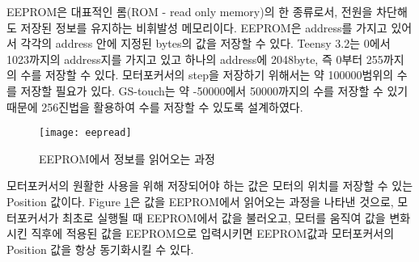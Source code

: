 EEPROM은 대표적인 롬(ROM - read only memory)의 한 종류로서, 전원을 차단해도 저장된 정보를 유지하는 비휘발성 메모리이다. EEPROM은 address를 가지고 있어서 각각의 address 안에 지정된 bytes의 값을 저장할 수 있다. Teensy 3.2는 0에서 1023까지의 address지를 가지고 있고 하나의 address에 2048byte, 즉 0부터 255까지의 수를 저장할 수 있다. 모터포커서의 step을 저장하기 위해서는 약 100000범위의 수를 저장할 필요가 있다. GS-touch는 약 -50000에서 50000까지의 수를 저장할 수 있기 때문에 256진법을 활용하여 수를 저장할 수 있도록 설계하였다.


\begin{figure}[ht]
	\begin{center}
		\texttt{[image: eepread]}
	\end{center}
	\caption{EEPROM에서 정보를 읽어오는 과정}
	\label{eepread}
\end{figure}

 모터포커서의 원활한 사용을 위해 저장되어야 하는 값은 모터의 위치를 저장할 수 있는 Position 값이다. \textrm{Figure} \ref{eepread}은 값을 EEPROM에서 읽어오는 과정을 나타낸 것으로, 모터포커서가 최초로 실행될 때 EEPROM에서 값을 불러오고, 모터를 움직여 값을 변화시킨 직후에 적용된 값을 EEPROM으로 입력시키면 EEPROM값과 모터포커서의 Position 값을 항상 동기화시킬 수 있다.



